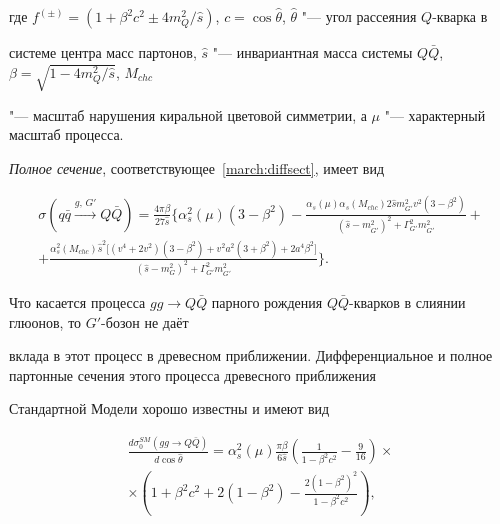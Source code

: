 где $f^{(\pm)}=(1+\beta^2 c^2\pm 4m_Q^2/\hat{s})$, $c = \cos \hat{\theta}$, $\hat{\theta}$ "--- угол рассеяния $Q$-кварка в

системе центра масс партонов, $\hat{s}$ "--- инвариантная масса системы $Q \bar{Q}$, $\beta = \sqrt{1-4m_Q^2/\hat{s}}$, $M_{chc}$

"--- масштаб нарушения киральной цветовой симметрии, а $\mu$ "--- характерный масштаб процесса.



\textit{Полное сечение}, соответствующее~\eqref{march:diffsect}, имеет вид

\begin{multline}

\sigma(q\bar{q} \stackrel{g,\,G'}{\rightarrow} Q \bar{Q}) = \frac{4\pi \beta}{27\hat{s}} \bigg \lbrace \alpha_s^2(\mu)

(3-\beta^2) %

- \frac{\alpha_s(\mu) \alpha_s(M_{chc}) 2 \hat{s}m_{G'}^2v^2(3-\beta^2)}

{(\hat{s}-m_{G'}^2)^2+\Gamma_{G'}^2 m_{G'}^2}+\\

+\frac{\alpha_s^2(M_{chc}) \hat{s}^2 \big[ (v^4+2v^2)(3-\beta^2) + v^2 a^2 (3+\beta^2) + 2a^4\beta^2 \big]} {(\hat{s}-m_{G }^2)^2

+ \Gamma_{G'}^2 m_{G'}^2} \bigg \rbrace.

 \label{march:sect}

\end{multline}



Что касается процесса $g g  \rightarrow Q \bar{Q}$ парного рождения  $Q \bar{Q}$-кварков в слиянии глюонов, то $G'$-бозон не даёт

вклада в этот процесс в древесном приближении. Дифференциальное и полное партонные сечения этого процесса древесного приближения

Стандартной Модели хорошо известны и имеют вид

\begin{multline}

\frac{d \sigma^{SM}_0(gg\rightarrow Q \bar{Q})}{d \cos \hat{\theta}} = \alpha_s^2(\mu) \frac{\pi \beta}{6 \hat{s}}

\left(\frac{1}{1-\beta^2c^2}-\frac{9}{16}\right)\times \\

\times \left(1+\beta^2 c^2 + 2(1-\beta^2)  - \frac{2 (1-\beta^2)^2}{1-\beta^2 c^2}\right), \label{march:difcsggQQ}

\end{multline}

